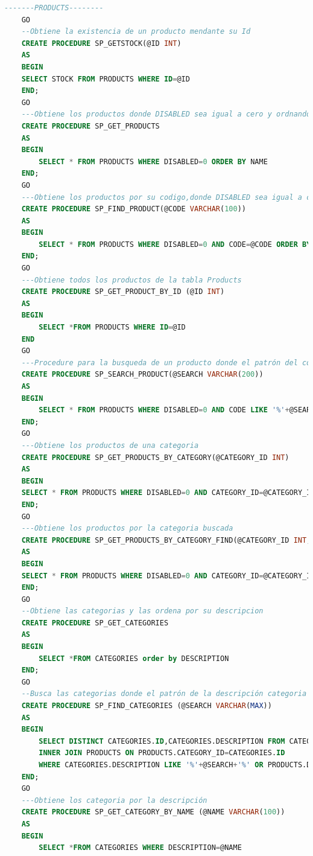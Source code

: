 \documentclass[a4paper,DIV=12]{scrreprt}
\begin{document}
\begin{lstlisting}[language={SQL}]
    -------PRODUCTS--------
    GO
    --Obtiene la existencia de un producto mendante su Id
    CREATE PROCEDURE SP_GETSTOCK(@ID INT)
    AS
    BEGIN
    SELECT STOCK FROM PRODUCTS WHERE ID=@ID
    END;
    GO
    ---Obtiene los productos donde DISABLED sea igual a cero y ordnandolos por su nombre
    CREATE PROCEDURE SP_GET_PRODUCTS
    AS
    BEGIN
        SELECT * FROM PRODUCTS WHERE DISABLED=0 ORDER BY NAME
    END;
    GO
    ---Obtiene los productos por su codigo,donde DISABLED sea igual a cero y ordnandolos por su nombre
    CREATE PROCEDURE SP_FIND_PRODUCT(@CODE VARCHAR(100))
    AS
    BEGIN
        SELECT * FROM PRODUCTS WHERE DISABLED=0 AND CODE=@CODE ORDER BY NAME
    END;
    GO
    ---Obtiene todos los productos de la tabla Products
    CREATE PROCEDURE SP_GET_PRODUCT_BY_ID (@ID INT)
    AS
    BEGIN
        SELECT *FROM PRODUCTS WHERE ID=@ID
    END
    GO
    ---Procedure para la busqueda de un producto donde el patrón del codigo o del nombre coincida
    CREATE PROCEDURE SP_SEARCH_PRODUCT(@SEARCH VARCHAR(200))
    AS
    BEGIN
        SELECT * FROM PRODUCTS WHERE DISABLED=0 AND CODE LIKE '%'+@SEARCH+'%' OR NAME LIKE '%'+@SEARCH+'%' ORDER BY NAME
    END;
    GO
    ---Obtiene los productos de una categoria 
    CREATE PROCEDURE SP_GET_PRODUCTS_BY_CATEGORY(@CATEGORY_ID INT)
    AS
    BEGIN
    SELECT * FROM PRODUCTS WHERE DISABLED=0 AND CATEGORY_ID=@CATEGORY_ID ORDER BY NAME
    END;
    GO
    ---Obtiene los productos por la categoria buscada 
    CREATE PROCEDURE SP_GET_PRODUCTS_BY_CATEGORY_FIND(@CATEGORY_ID INT,@SEARCH VARCHAR(MAX))
    AS
    BEGIN
    SELECT * FROM PRODUCTS WHERE DISABLED=0 AND CATEGORY_ID=@CATEGORY_ID AND NAME LIKE '%'+@SEARCH+'%' ORDER BY NAME
    END;
    GO
    --Obtiene las categorias y las ordena por su descripcion
    CREATE PROCEDURE SP_GET_CATEGORIES
    AS
    BEGIN
        SELECT *FROM CATEGORIES order by DESCRIPTION
    END;
    GO
    --Busca las categorias donde el patrón de la descripción categoria o de la descripción del producto coincida ordenandolos por su descripción
    CREATE PROCEDURE SP_FIND_CATEGORIES (@SEARCH VARCHAR(MAX)) 
    AS
    BEGIN
        SELECT DISTINCT CATEGORIES.ID,CATEGORIES.DESCRIPTION FROM CATEGORIES 
        INNER JOIN PRODUCTS ON PRODUCTS.CATEGORY_ID=CATEGORIES.ID
        WHERE CATEGORIES.DESCRIPTION LIKE '%'+@SEARCH+'%' OR PRODUCTS.DESCRIPTION LIKE '%'+@SEARCH+'%' order by CATEGORIES.DESCRIPTION,CATEGORIES.ID
    END;
    GO
    ---Obtiene los categoria por la descripción 
    CREATE PROCEDURE SP_GET_CATEGORY_BY_NAME (@NAME VARCHAR(100))
    AS
    BEGIN
        SELECT *FROM CATEGORIES WHERE DESCRIPTION=@NAME

\end{lstlisting}
\end{document}
